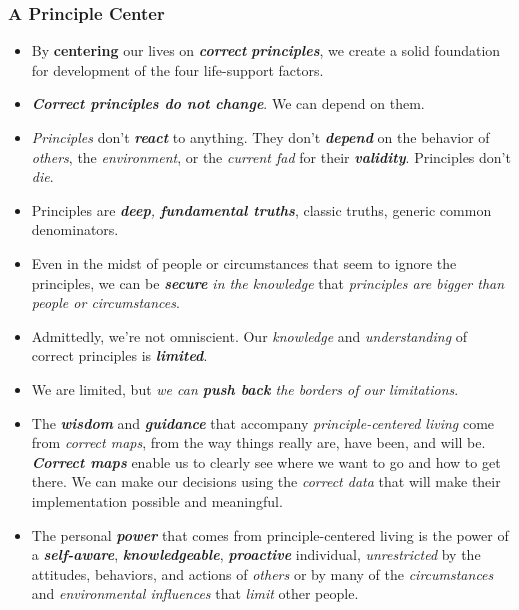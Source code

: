 \documentclass[11pt]{article}
\begin{document}
\subsubsection{A Principle Center}
\begin{itemize}
\item By \textbf{centering} our lives on \emph{\textbf{correct}} \emph{\textbf{principles}}, we create a solid foundation for development of the four life-support factors. 

\item \emph{\textbf{Correct principles do not change}}. We can depend on them.

\item \emph{Principles} don't \emph{\textbf{react}} to anything. They don't \emph{\textbf{depend}} on the behavior of \emph{others}, the \emph{environment}, or the \emph{current fad} for their \emph{\textbf{validity}}. Principles don't \emph{die}.

\item Principles are \emph{\textbf{deep}, \textbf{fundamental truths}}, classic truths, generic common denominators.

\item Even in the midst of people or circumstances that seem to ignore the principles, we can be \emph{\textbf{secure} in the knowledge} that \emph{principles are bigger than people or circumstances}.

\item Admittedly, we're not omniscient. Our \emph{knowledge} and \emph{understanding} of correct principles is \emph{\textbf{limited}}.

\item We are limited, but \emph{we can \textbf{push back} the borders of our limitations}. 

\item The \emph{\textbf{wisdom}} and \emph{\textbf{guidance}} that accompany \emph{principle-centered living} come from \emph{correct maps}, from the way things really are, have been, and will be.  \emph{\textbf{Correct maps}} enable us to clearly see where we want to go and how to get there. We can make our decisions using the \emph{correct data} that will make their implementation possible and meaningful.

\item The personal \emph{\textbf{power}} that comes from principle-centered living is the power of a \emph{\textbf{self-aware}}, \emph{\textbf{knowledgeable}}, \emph{\textbf{proactive}} individual, \emph{unrestricted} by the attitudes, behaviors, and actions of \emph{others} or by many of the \emph{circumstances} and \emph{environmental influences} that \emph{limit} other people.


\end{itemize}
\end{document}
